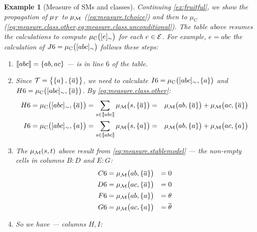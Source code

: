 \documentclass{tlp}
\newtheorem{example}{Example}
\newcommand{\at}[1]{\ensuremath{\!\del{#1}}}        %
\newcommand{\cla}[1]{\ensuremath{{\cal #1}}}        %
\newcommand{\co}[1]{\ensuremath{\overline{#1}}}     %
\newcommand{\TCHOICEset}{\ensuremath{\cla{T}}}
\newcommand{\MODELset}{\ensuremath{\cla{M}}}
\newcommand{\EVENTSset}{\ensuremath{\cla{E}}}
\newcommand{\pwT}{\ensuremath{\mu_{\TCHOICEset}}}
\newcommand{\pwM}{\ensuremath{\mu_{\MODELset}}}
\newcommand{\pwm}[1]{\ensuremath{\pwM\at{#1}}}
\newcommand{\pwC}{\ensuremath{\mu_{\textrm{C}}}}
\newcommand{\pwc}[1]{\ensuremath{\pwC\at{#1}}}
\newcommand{\stablecore}[1]{\ensuremath{\left\llbracket #1 \right\rrbracket}}
\newcommand{\class}[1]{\ensuremath{[{#1}]_{\sim}}}
\begin{document}
{\begin{example}[Measure of \aclp{SM} and classes]
      Continuing \cref{ex:fruitful}, we show the propagation of \(\pwT\) to \(\pwM\) (\cref{eq:measure.tchoice}) and then to \(\pwC\) (\cref{eq:measure.class.other,eq:measure.class.unconditional}). The table above resumes the calculations to compute \(\pwc{\class{e}}\) for each \(e \in \EVENTSset\). For example, \(e = abc\) the calculation of \(J6 = \pwc{\class{abc}}\) follows these steps:
      \begin{enumerate}
          \item \(\stablecore{abc} = \set{ab,ac}\) --- is in line \(6\) of the table.
          \item Since \(\TCHOICEset = \set{\set{a}, \set{\co{a}}}\), we need to calculate \(I6 = \pwc{\class{abc}, \set{a}}\) and \(H6 = \pwc{\class{abc}, \set{\co{a}}}\). By \cref{eq:measure.class.other}:
                \begin{equation*}
                    \begin{aligned}
                        H6 = \pwc{\class{abc}, \set{\co{a}}} & = \sum_{s \in \stablecore{abc}} \pwm{s, \set{\co{a}}}
                        =                                    & \pwm{ab, \set{\co{a}}} +  \pwm{ac, \set{\co{a}}}      \\
                        I6 = \pwc{\class{abc}, \set{a}}      & = \sum_{s \in \stablecore{abc}} \pwm{s, \set{a}}
                        =                                    & \pwm{ab, \set{a}} +  \pwm{ac, \set{a}}
                    \end{aligned}
                \end{equation*}
          \item The \(\pwm{s,t}\) above result from \cref{eq:measure.stablemodel} --- the non-empty cells in columns \(B:D\) and \(E:G\):
                \begin{equation*}
                    \begin{aligned}
                        C6 & = \pwm{ab, \set{\co{a}}} & = 0           \\
                        D6 & = \pwm{ac, \set{\co{a}}} & = 0           \\
                        F6 & = \pwm{ab, \set{a}}      & = \theta      \\
                        G6 & = \pwm{ac, \set{a}}      & = \co{\theta}
                    \end{aligned}
                \end{equation*}
          \item So we have --- columns \(H, I\):
                \begin{equation*}

\end{equation*}
\end{enumerate}
\end{example}}
\end{document}
